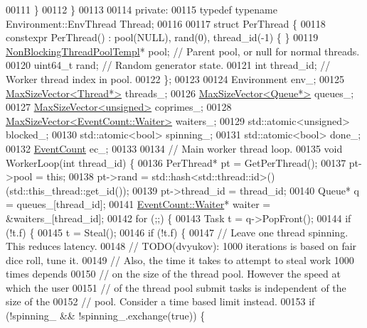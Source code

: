 \begin{DoxyCode}
{00111     \}
00112   \}
00113 
00114  \textcolor{keyword}{private}:
00115   \textcolor{keyword}{typedef} \textcolor{keyword}{typename} Environment::EnvThread Thread;
00116 
00117   \textcolor{keyword}{struct }PerThread \{
00118     constexpr PerThread() : pool(NULL), rand(0), thread\_id(-1) \{ \}
00119     \hyperlink{class_eigen_1_1_non_blocking_thread_pool_templ}{NonBlockingThreadPoolTempl}* pool;  \textcolor{comment}{// Parent pool, or null for normal
       threads.}
00120     uint64\_t rand;  \textcolor{comment}{// Random generator state.}
00121     \textcolor{keywordtype}{int} thread\_id;  \textcolor{comment}{// Worker thread index in pool.}
00122   \};
00123 
00124   Environment env\_;
00125   \hyperlink{class_eigen_1_1_max_size_vector}{MaxSizeVector<Thread*>} threads\_;
00126   \hyperlink{class_eigen_1_1_max_size_vector}{MaxSizeVector<Queue*>} queues\_;
00127   \hyperlink{class_eigen_1_1_max_size_vector}{MaxSizeVector<unsigned>} coprimes\_;
00128   \hyperlink{class_eigen_1_1_max_size_vector}{MaxSizeVector<EventCount::Waiter>} waiters\_;
00129   std::atomic<unsigned> blocked\_;
00130   std::atomic<bool> spinning\_;
00131   std::atomic<bool> done\_;
00132   \hyperlink{class_eigen_1_1_event_count}{EventCount} ec\_;
00133 
00134   \textcolor{comment}{// Main worker thread loop.}
00135   \textcolor{keywordtype}{void} WorkerLoop(\textcolor{keywordtype}{int} thread\_id) \{
00136     PerThread* pt = GetPerThread();
00137     pt->pool = \textcolor{keyword}{this};
00138     pt->rand = std::hash<std::thread::id>()(std::this\_thread::get\_id());
00139     pt->thread\_id = thread\_id;
00140     Queue* q = queues\_[thread\_id];
00141     \hyperlink{class_eigen_1_1_event_count_1_1_waiter}{EventCount::Waiter}* waiter = &waiters\_[thread\_id];
00142     \textcolor{keywordflow}{for} (;;) \{
00143       Task t = q->PopFront();
00144       \textcolor{keywordflow}{if} (!t.f) \{
00145         t = Steal();
00146         \textcolor{keywordflow}{if} (!t.f) \{
00147           \textcolor{comment}{// Leave one thread spinning. This reduces latency.}
00148           \textcolor{comment}{// TODO(dvyukov): 1000 iterations is based on fair dice roll, tune it.}
00149           \textcolor{comment}{// Also, the time it takes to attempt to steal work 1000 times depends}
00150           \textcolor{comment}{// on the size of the thread pool. However the speed at which the user}
00151           \textcolor{comment}{// of the thread pool submit tasks is independent of the size of the}
00152           \textcolor{comment}{// pool. Consider a time based limit instead.}
00153           \textcolor{keywordflow}{if} (!spinning\_ && !spinning\_.exchange(\textcolor{keyword}{true})) \{
}
\end{DoxyCode}
